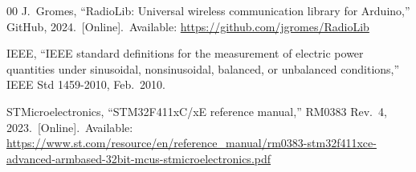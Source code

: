 \documentclass[conference]{IEEEtran}
\begin{document}
\begin{thebibliography}{00}
J.\ Gromes, ``RadioLib: Universal wireless communication library for
Arduino,'' GitHub, 2024.\ [Online].\ Available:
\url{https://github.com/jgromes/RadioLib}

IEEE, ``IEEE standard definitions for the measurement of electric power
quantities under sinusoidal, nonsinusoidal, balanced, or unbalanced
conditions,'' IEEE Std 1459-2010, Feb.\ 2010.

STMicroelectronics, ``STM32F411xC/xE reference manual,'' RM0383
Rev.~4, 2023.\ [Online].\ Available:
\url{https://www.st.com/resource/en/reference_manual/rm0383-stm32f411xce-advanced-armbased-32bit-mcus-stmicroelectronics.pdf}

\end{thebibliography}
\end{document}
